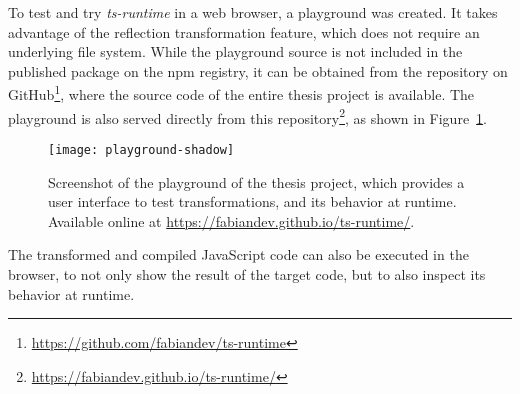 To test and try \emph{ts-runtime} in a web browser, a playground was created. It takes advantage of the reflection transformation feature, which does not require an underlying file system. While the playground source is not included in the published package on the npm registry, it can be obtained from the repository on GitHub\footnote{\url{https://github.com/fabiandev/ts-runtime}}, where the source code of the entire thesis project is available. The playground is also served directly from this repository\footnote{\url{https://fabiandev.github.io/ts-runtime/}}, as shown in Figure~\ref{fig:playground}.
\begin{figure}
\centering
\texttt{[image: playground-shadow]}
\caption{Screenshot of the playground of the thesis project, which provides a user interface to test transformations, and its behavior at runtime. Available online at \url{https://fabiandev.github.io/ts-runtime/}.}
\label{fig:playground}
\end{figure}
The transformed and compiled JavaScript code can also be executed in the browser, to not only show the result of the target code, but to also inspect its behavior at runtime.

